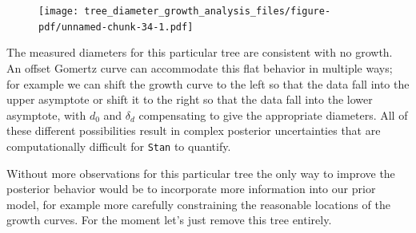 \documentclass[
  letterpaper,
  DIV=11,
  numbers=noendperiod]{scrartcl}
\newenvironment{Shaded}{\begin{snugshade}}{\end{snugshade}}
\newcommand{\AttributeTok}[1]{\textcolor[rgb]{0.40,0.45,0.13}{#1}}
\newcommand{\DecValTok}[1]{\textcolor[rgb]{0.68,0.00,0.00}{#1}}
\newcommand{\FloatTok}[1]{\textcolor[rgb]{0.68,0.00,0.00}{#1}}
\newcommand{\FunctionTok}[1]{\textcolor[rgb]{0.28,0.35,0.67}{#1}}
\newcommand{\NormalTok}[1]{\textcolor[rgb]{0.00,0.23,0.31}{#1}}
\newcommand{\SpecialCharTok}[1]{\textcolor[rgb]{0.37,0.37,0.37}{#1}}
\newcommand{\StringTok}[1]{\textcolor[rgb]{0.13,0.47,0.30}{#1}}
\begin{document}
\begin{Shaded}
\end{Shaded}

\begin{figure}[H]

{\centering \texttt{[image: tree\_diameter\_growth\_analysis\_files/figure-pdf/unnamed-chunk-34-1.pdf]}

}

\end{figure}

The measured diameters for this particular tree are consistent with no
growth. An offset Gomertz curve can accommodate this flat behavior in
multiple ways; for example we can shift the growth curve to the left so
that the data fall into the upper asymptote or shift it to the right so
that the data fall into the lower asymptote, with \(d_{0}\) and
\(\delta_{d}\) compensating to give the appropriate diameters. All of
these different possibilities result in complex posterior uncertainties
that are computationally difficult for \texttt{Stan} to quantify.

Without more observations for this particular tree the only way to
improve the posterior behavior would be to incorporate more information
into our prior model, for example more carefully constraining the
reasonable locations of the growth curves. For the moment let's just
remove this tree entirely.
\end{document}

